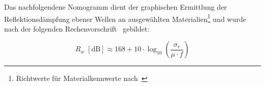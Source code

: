 
Das nachfolgendene Nomogramm dient der graphischen Ermittlung der Reflektionsdämpfung ebener Wellen an ausgewählten Materialien\footnote{Richtwerte für Materialkennwerte nach~\cite{Simplified_shielding}} und wurde nach der folgenden Rechenvorschrift~\cite{Simplified_shielding} gebildet:

\begin{equation}
    R_w \; \left[\text{dB}\right] \approx 168 + 10 \cdot \log_{10}\left(\frac{\sigma_r}{\mu \cdot f}\right)
\end{equation}